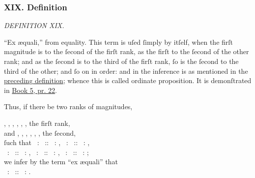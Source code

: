 \documentclass[12pt,preview]{standalone}
\begin{document}
\subsubsection{XIX. Definition}

\begin{minipage}{\textwidth}

    \begin{center}
        \textit{DEFINITION XIX.}\label{book5def19} \\
    \end{center}

    \hfill

    \newcommand{\redA}{{\color{cred}{A}}}
    \newcommand{\redB}{{\color{cred}{B}}}
    \newcommand{\redL}{{\color{cred}{L}}}
    \newcommand{\redM}{{\color{cred}{M}}}
    \newcommand{\yellowC}{{\color{cyellow}{C}}}
    \newcommand{\yellowD}{{\color{cyellow}{D}}}
    \newcommand{\yellowN}{{\color{cyellow}{N}}}
    \newcommand{\yellowO}{{\color{cyellow}{O}}}
    \newcommand{\blueE}{{\color{cblue}{E}}}
    \newcommand{\blueF}{{\color{cblue}{F}}}
    \newcommand{\blueP}{{\color{cblue}{P}}}
    \newcommand{\blueQ}{{\color{cblue}{Q}}}

    \raggedright “Ex \ae quali,” from equality. This term is uſed ſimply by itſelf, when the firſt magnitude is to the ſecond of the firſt rank, as the firſt to the ſecond of the other rank; and as the ſecond is to the third of the firſt rank, ſo is the ſecond to the third of the other; and ſo on in order: and in the inference is as mentioned in the \hyperref[book5def18]{preceding definition}; whence this is called ordinate proposition. It is demonſtrated in \hyperref[book5pr22]{Book 5, pr. 22}.\\

    \hfill

    Thus, if there be two ranks of magnitudes,\\

    \hfill

    \begin{center}
        \redA, \redB, \yellowC, \yellowD, \blueE, \blueF, the firſt rank,\\
        and \redL, \redM, \yellowN, \yellowO, \blueP, \blueQ, the ſecond,\\
        ſuch that \redA\ : \redB\ :: \redL\ : \redM, \redB\ : \yellowC\ :: \redM\ : \yellowN,\\
        \yellowC\ : \yellowD\ :: \yellowN\ : \yellowO, \yellowD\ : \blueE\ :: \yellowO\ : \blueP, \blueE\ : \blueF\ :: \blueP\ : \blueQ;\\
        we infer by the term “ex \ae quali” that\\
        \redA\ : \blueF\ :: \redL\ : \blueQ.
    \end{center}

    \hfill

\end{minipage}
\end{document}
